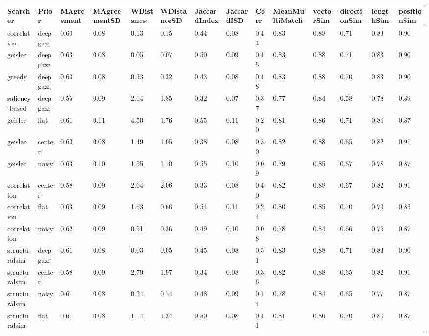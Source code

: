 \begin{tabular}{llllllllllllll}
Searcher & Prior & MAgreement & MAgreementSD & WDistance & WDistanceSD & JaccardIndex & JaccardISD & Corr & MeanMultiMatch & vectorSim & directionSim & lengthSim & positionSim \\ 
\hline 
correlation & deepgaze & 0.60 & 0.08 & 0.13 & 0.15 & 0.44 & 0.08 & 0.44 & 0.83 & 0.88 & 0.71 & 0.83 & 0.90 \\ 
geisler & deepgaze & 0.63 & 0.08 & 0.05 & 0.07 & 0.50 & 0.09 & 0.45 & 0.83 & 0.88 & 0.71 & 0.83 & 0.90 \\ 
greedy & deepgaze & 0.60 & 0.08 & 0.33 & 0.32 & 0.43 & 0.08 & 0.48 & 0.83 & 0.88 & 0.70 & 0.83 & 0.90 \\ 
saliency-based & deepgaze & 0.55 & 0.09 & 2.14 & 1.85 & 0.32 & 0.07 & 0.37 & 0.77 & 0.84 & 0.58 & 0.78 & 0.89 \\ 
geisler & flat & 0.61 & 0.11 & 4.50 & 1.76 & 0.55 & 0.11 & 0.20 & 0.81 & 0.86 & 0.71 & 0.80 & 0.87 \\ 
geisler & center & 0.60 & 0.08 & 1.49 & 1.05 & 0.38 & 0.08 & 0.30 & 0.82 & 0.88 & 0.65 & 0.82 & 0.91 \\ 
geisler & noisy & 0.63 & 0.10 & 1.55 & 1.10 & 0.55 & 0.10 & 0.09 & 0.79 & 0.85 & 0.67 & 0.78 & 0.87 \\ 
correlation & center & 0.58 & 0.09 & 2.64 & 2.06 & 0.33 & 0.08 & 0.40 & 0.82 & 0.88 & 0.67 & 0.82 & 0.91 \\ 
correlation & flat & 0.63 & 0.09 & 1.63 & 0.66 & 0.54 & 0.11 & 0.24 & 0.80 & 0.85 & 0.70 & 0.79 & 0.85 \\ 
correlation & noisy & 0.62 & 0.09 & 0.51 & 0.36 & 0.49 & 0.10 & 0.08 & 0.78 & 0.84 & 0.66 & 0.76 & 0.87 \\ 
structuralsim & deepgaze & 0.61 & 0.08 & 0.03 & 0.05 & 0.45 & 0.08 & 0.51 & 0.83 & 0.88 & 0.71 & 0.83 & 0.90 \\ 
structuralsim & center & 0.58 & 0.09 & 2.79 & 1.97 & 0.34 & 0.08 & 0.36 & 0.82 & 0.88 & 0.65 & 0.82 & 0.91 \\ 
structuralsim & noisy & 0.61 & 0.08 & 0.24 & 0.14 & 0.48 & 0.09 & 0.14 & 0.78 & 0.84 & 0.65 & 0.77 & 0.87 \\ 
structuralsim & flat & 0.61 & 0.08 & 1.14 & 1.34 & 0.50 & 0.08 & 0.41 & 0.81 & 0.86 & 0.70 & 0.80 & 0.87 \\ 
\hline 
\end{tabular}